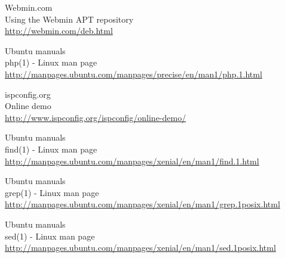 \begin{thebibliography}{10}
Webmin.com\\
Using the Webmin APT repository\\
  \url{http://webmin.com/deb.html}

Ubuntu manuals\\
php(1) - Linux man page\\
  \url{http://manpages.ubuntu.com/manpages/precise/en/man1/php.1.html}

ispconfig.org\\
Online demo\\
  \url{http://www.ispconfig.org/ispconfig/online-demo/}

Ubuntu manuals\\
find(1) - Linux man page\\
  \url{http://manpages.ubuntu.com/manpages/xenial/en/man1/find.1.html}

Ubuntu manuals\\
grep(1) - Linux man page\\
  \url{http://manpages.ubuntu.com/manpages/xenial/en/man1/grep.1posix.html}

Ubuntu manuals\\
sed(1) - Linux man page\\
  \url{http://manpages.ubuntu.com/manpages/xenial/en/man1/sed.1posix.html}

\end{thebibliography}

